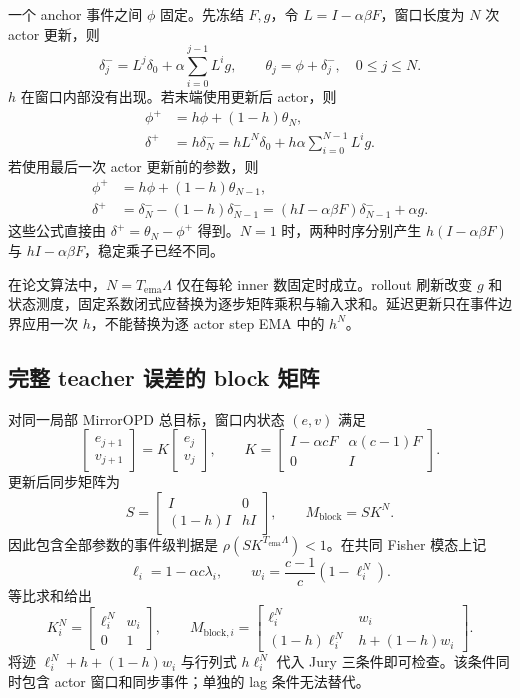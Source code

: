 一个 anchor 事件之间 $\phi$ 固定。先冻结 $F,g$，令 $L=I-\alpha\beta F$，窗口长度为 $N$ 次 actor 更新，则
\[
 \delta_j^-=L^j\delta_0+\alpha\sum_{i=0}^{j-1}L^ig,
 \qquad\theta_j=\phi+\delta_j^-,\quad0\le j\le N.
\]
$h$ 在窗口内部没有出现。若末端使用更新后 actor，则
\begin{align}
 \phi^+&=h\phi+(1-h)\theta_N,\\
 \delta^+&=h\delta_N^-
 =hL^N\delta_0+h\alpha\sum_{i=0}^{N-1}L^ig.
 \label{eq:ema-block-post}
\end{align}
若使用最后一次 actor 更新前的参数，则
\begin{align}
 \phi^+&=h\phi+(1-h)\theta_{N-1},\\
 \delta^+&=\delta_N^--(1-h)\delta_{N-1}^-
 =(hI-\alpha\beta F)\delta_{N-1}^-+\alpha g.
 \label{eq:ema-block-pre}
\end{align}
这些公式直接由 $\delta^+=\theta_N-\phi^+$ 得到。$N=1$ 时，两种时序分别产生 $h(I-\alpha\beta F)$ 与 $hI-\alpha\beta F$，稳定乘子已经不同。

在论文算法中，$N=T_{\mathrm{ema}}\Lambda$ 仅在每轮 inner 数固定时成立。rollout 刷新改变 $g$ 和状态测度，固定系数闭式应替换为逐步矩阵乘积与输入求和。延迟更新只在事件边界应用一次 $h$，不能替换为逐 actor step EMA 中的 $h^N$。

\subsection{完整 teacher 误差的 block 矩阵}

对同一局部 MirrorOPD 总目标，窗口内状态 $(e,v)$ 满足
\[
 \begin{bmatrix}e_{j+1}\\v_{j+1}\end{bmatrix}
 =K\begin{bmatrix}e_j\\v_j\end{bmatrix},\qquad
 K=\begin{bmatrix}I-\alpha cF&\alpha(c-1)F\\0&I\end{bmatrix}.
\]
更新后同步矩阵为
\[
 S=\begin{bmatrix}I&0\\(1-h)I&hI\end{bmatrix},
 \qquad M_{\mathrm{block}}=SK^N.
\]
因此包含全部参数的事件级判据是 $\rho(SK^{T_{\mathrm{ema}}\Lambda})<1$。在共同 Fisher 模态上记
\[
 \ell_i=1-\alpha c\lambda_i,\qquad
 w_i=\frac{c-1}{c}(1-\ell_i^N).
\]
等比求和给出
\[
 K_i^N=\begin{bmatrix}\ell_i^N&w_i\\0&1\end{bmatrix},\qquad
 M_{\mathrm{block},i}=\begin{bmatrix}\ell_i^N&w_i\\
 (1-h)\ell_i^N&h+(1-h)w_i\end{bmatrix}.
\]
将迹 $\ell_i^N+h+(1-h)w_i$ 与行列式 $h\ell_i^N$ 代入 Jury 三条件即可检查。该条件同时包含 actor 窗口和同步事件；单独的 lag 条件无法替代。

